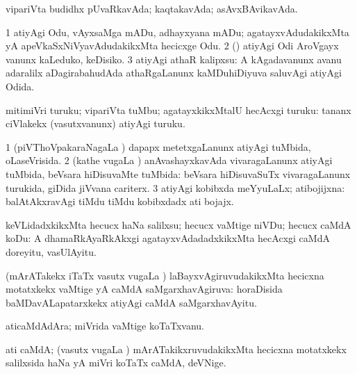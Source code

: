 \bentry
{}
\gl{\gu}
\bmng
vipariVta budidhx pUvaRkavAda; kaqtakavAda; asAvxBAvikavAda. 
\emng
\eentry

\bentry
{}
\gl{\sakirx}
\bmng
\bnum
\num{1} atiyAgi Odu, vAyxsaMga mADu, adhayxyana mADu; agatayxvAdudakikxMta yA apeVkaSxNiVyavAdudakikxMta hecicxge Odu. 
\num{2} (\AtAmx) atiyAgi Odi AroVgayx \mo vanunx kaLeduko, keDisiko. 
\num{3} atiyAgi athaR kalipxsu:  A kAgadavanunx avanu adaralilx aDagirabahudAda athaRgaLanunx kaMDuhiDiyuva saluvAgi atiyAgi Odida. 
\enum
\emng
\eentry

\bentry
{}
\gl{\sakirx}
\bmng
mitimiVri turuku; vipariVta tuMbu; agatayxkikxMtalU hecAcxgi turuku:  tananx ciVlakekx (vasutxvanunx) atiyAgi turuku. 
\emng
\eentry

\bentry
{}
\gl{\gu}
\bmng
\bnum
\num{1} (piVThoVpakaraNagaLa \vi) dapapx metetxgaLanunx atiyAgi tuMbida, oLaseVrisida. 
\num{2} (kathe \mo vugaLa \vi) anAvashayxkavAda vivaragaLanunx atiyAgi tuMbida, beVsara hiDisuvaMte tuMbida:  beVsara hiDisuvaSuTx vivaragaLanunx turukida, giDida jiVvana cariterx. 
\num{3} atiyAgi kobibxda meYyuLaLx; atibojijxna:  balAtAkxravAgi tiMdu tiMdu kobibxdadx ati bojajx. 
\enum
\emng
\eentry

\bentry
{}
\gl{\sakirx}
\bmng
keVLidadxkikxMta hecucx haNa salilxsu; hecucx vaMtige niVDu; hecucx caMdA koDu:  A dhamaRkAyaRkAkxgi agatayxvAdadadxkikxMta hecAcxgi caMdA doreyitu, vasUlAyitu. 
\emng
\eentry

\bentry
{}
\gl{\gu}
\bmng
(mArATakekx iTaTx vasutx \mo vugaLa \vi) laBayxvAgiruvudakikxMta hecicxna motatxkekx vaMtige yA caMdA saMgarxhavAgiruva:  horaDisida baMDavALapatarxkekx atiyAgi caMdA saMgarxhavAyitu. 
\emng
\eentry

\bentry
{}
\gl{\nA}
\bmng
aticaMdAdAra; miVrida vaMtige koTaTxvanu. 
\emng
\eentry

\bentry
{}
\gl{\nA}
\bmng
ati caMdA; (vasutx \mo vugaLa \vi) mArATakikxruvudakikxMta hecicxna motatxkekx salilxsida haNa yA miVri koTaTx caMdA, deVNige. 
\emng
\eentry

